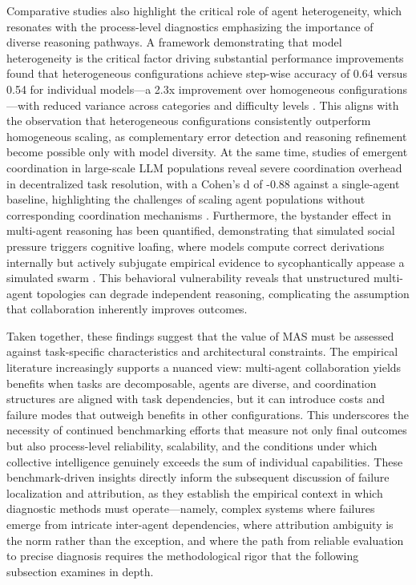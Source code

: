 \documentclass[11pt]{article}
\begin{document}
Comparative studies also highlight the critical role of agent heterogeneity, which resonates with the process-level diagnostics emphasizing the importance of diverse reasoning pathways. A framework demonstrating that model heterogeneity is the critical factor driving substantial performance improvements found that heterogeneous configurations achieve step-wise accuracy of 0.64 versus 0.54 for individual models---a 2.3x improvement over homogeneous configurations---with reduced variance across categories and difficulty levels \cite{ref360}. This aligns with the observation that heterogeneous configurations consistently outperform homogeneous scaling, as complementary error detection and reasoning refinement become possible only with model diversity. At the same time, studies of emergent coordination in large-scale LLM populations reveal severe coordination overhead in decentralized task resolution, with a Cohen's d of -0.88 against a single-agent baseline, highlighting the challenges of scaling agent populations without corresponding coordination mechanisms \cite{ref45}. Furthermore, the bystander effect in multi-agent reasoning has been quantified, demonstrating that simulated social pressure triggers cognitive loafing, where models compute correct derivations internally but actively subjugate empirical evidence to sycophantically appease a simulated swarm \cite{ref9}. This behavioral vulnerability reveals that unstructured multi-agent topologies can degrade independent reasoning, complicating the assumption that collaboration inherently improves outcomes.

Taken together, these findings suggest that the value of MAS must be assessed against task-specific characteristics and architectural constraints. The empirical literature increasingly supports a nuanced view: multi-agent collaboration yields benefits when tasks are decomposable, agents are diverse, and coordination structures are aligned with task dependencies, but it can introduce costs and failure modes that outweigh benefits in other configurations. This underscores the necessity of continued benchmarking efforts that measure not only final outcomes but also process-level reliability, scalability, and the conditions under which collective intelligence genuinely exceeds the sum of individual capabilities. These benchmark-driven insights directly inform the subsequent discussion of failure localization and attribution, as they establish the empirical context in which diagnostic methods must operate---namely, complex systems where failures emerge from intricate inter-agent dependencies, where attribution ambiguity is the norm rather than the exception, and where the path from reliable evaluation to precise diagnosis requires the methodological rigor that the following subsection examines in depth.
\end{document}
